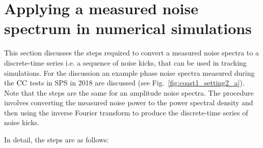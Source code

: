 
\section{Applying a measured noise spectrum in numerical simulations}\label{sec:measured_spectra_to_time_series}

This section discusses the steps required to convert a measured noise spectra to a discrete-time series i.e. a sequence of noise kicks, that can be used in tracking simulations. For the discussion an example phase noise spectra measured during the ${\mathrm{CC}}$ tests in SPS in 2018 are discussed (see Fig.~\ref{fig:coast1_setting2_a}). Note that the steps are the same for an amplitude noise spectra. The procedure involves converting the measured noise power to the power spectral density and then using the inverse Fourier transform to produce the discrete-time series of noise kicks. 

In detail, the steps are as follows:

